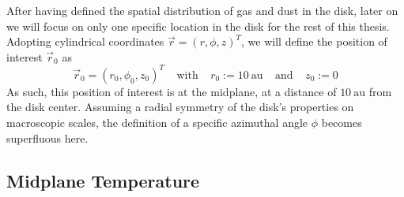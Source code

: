     After having defined the spatial distribution of gas and dust in the disk, later on we will 
    focus on only one specific location in the disk for the rest of this thesis. Adopting 
    cylindrical coordinates $\vec r = ( r, \phi, z )^T$, we will define the
    position of interest $\vec r_0$ as
    \begin{equation}
        \label{eq:definition_of_position_of_interest}
        \vec r_0 = (r_0, \phi_0, z_0 )^T
        \ \ \ \ \ \text{with} \ \ \ \ \
        r_0 := 10~\text{au}
        \ \ \ \ \ \text{and} \ \ \ \ \
        z_0 := 0
    \end{equation}
    As such, this position of interest is at the midplane, at a distance of $10\ \text{au}$ from 
    the disk center. Assuming a radial symmetry of the disk's properties on macroscopic scales, the
    definition of a specific azimuthal angle $\phi$ becomes superfluous here.

    
    
    
    
\clearpage\subsection{Midplane Temperature}


